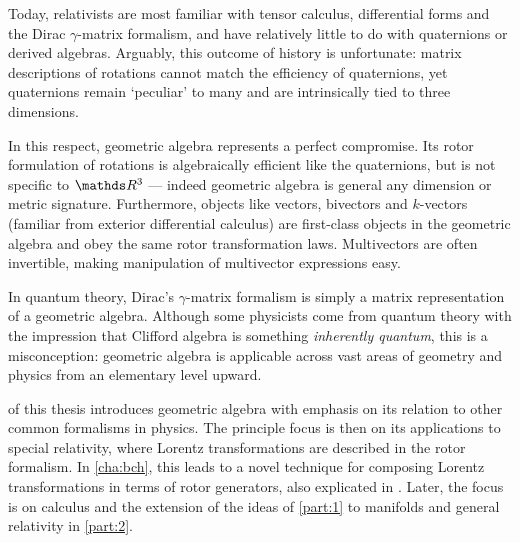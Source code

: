 Today, relativists are most familiar with tensor calculus, differential forms and the Dirac $γ$-matrix formalism, and have relatively little to do with quaternions or derived algebras.
Arguably, this outcome of history is unfortunate: matrix descriptions of rotations cannot match the efficiency of quaternions, yet quaternions remain `peculiar' to many and are intrinsically tied to three dimensions.

In this respect, geometric algebra represents a perfect compromise.
Its rotor formulation of rotations is algebraically efficient like the quaternions, but is not specific to $\RR^3$ --- indeed geometric algebra is general any dimension or metric signature.
Furthermore, objects like vectors, bivectors and $k$-vectors (familiar from exterior differential calculus) are first-class objects in the geometric algebra and obey the same rotor transformation laws.
Multivectors are often invertible, making manipulation of multivector expressions easy.

In quantum theory, Dirac's $γ$-matrix formalism is simply a matrix representation of a geometric algebra.
Although some physicists come from quantum theory with the impression that Clifford algebra is something \emph{inherently quantum}, this is a misconception: geometric algebra is applicable across vast areas of geometry and physics from an elementary level upward.

 of this thesis introduces geometric algebra with emphasis on its relation to other common formalisms in physics.
The principle focus is then on its applications to special relativity, where Lorentz transformations are described in the rotor formalism.
In \cref{cha:bch}, this leads to a novel technique for composing Lorentz transformations in terms of rotor generators, also explicated in \cite{wilson2021ga-bch}.
Later, the focus is on calculus and the extension of the ideas of \cref{part:1} to manifolds and general relativity in \cref{part:2}.
